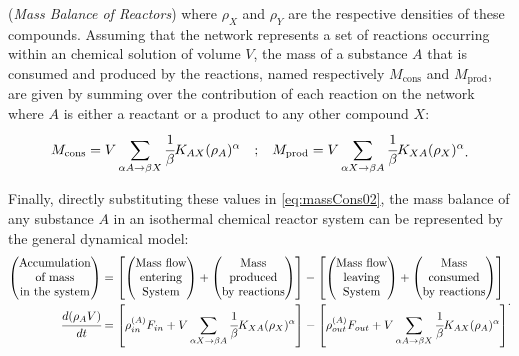 \documentclass[a4paper,11pt]{book}
\numberwithin{figure}{chapter}
\numberwithin{equation}{chapter}
\numberwithin{table}{chapter}
\theoremstyle{definition}
\newtheorem{example}{Example}[chapter]
\newcounter{boxed-theorem}
\newcounter{boxed-definition}
\newcounter{boxed-example}
\newenvironment{boxed-example}[1]
{\colorlet{shadecolor}{pastelRed!20} \begin{shaded} \begin{example}{#1}}
{\end{example} \end{shaded}}
\begin{document}
\begin{boxed-example}{(\textit{Mass Balance of Reactors})}
    \noindent where $\rho_X$ and $\rho_Y$ are the respective densities of these compounds. Assuming that the network represents a set of reactions occurring within an chemical solution of volume $V$, the mass of a substance $A$ that is consumed and produced by the reactions, named respectively $M_\text{cons}$ and $M_\text{prod}$, are given by summing over the contribution of each reaction on the network where $A$ is either a reactant or a product to any other compound $X$:
    \begin{equation}
    \begin{matrix}
            M_\text{cons} = V \displaystyle\sum_{\alpha A \rightarrow \beta X} \cfrac{1}{\beta} K_{AX} (\rho_A)^{\alpha} &; &  M_\text{prod} = V \displaystyle\sum_{\alpha X \rightarrow \beta A} \cfrac{1}{\beta} K_{XA} (\rho_X)^{\alpha}
    \end{matrix}
    .\end{equation}
    
    Finally, directly substituting these values in \eqref{eq:massCons02}, the mass balance of any substance $A$ in an isothermal chemical reactor system can be represented by the general dynamical model:
    \begin{equation}
    \begin{split}
        \begin{pmatrix}
        \text{Accumulation} \\ \text{of mass} \\ \text{in the system}
    \end{pmatrix} &= \left[ \begin{pmatrix}
        \text{Mass flow} \\ \text{entering} \\ \text{System}
    \end{pmatrix} + \begin{pmatrix}
        \text{Mass} \\  \text{produced} \\ \text{by reactions}
    \end{pmatrix} \right] - \left[ \begin{pmatrix}
        \text{Mass flow} \\ \text{leaving} \\ \text{System}
    \end{pmatrix} + \begin{pmatrix}
        \text{Mass} \\ \text{consumed} \\ \text{by reactions}
    \end{pmatrix} \right] \\
        \cfrac{d (\rho_A V)}{dt} &= \left[ \rho^{(A)}_{in} F_{in} + V \sum_{\alpha X \rightarrow \beta A} \cfrac{1}{\beta} K_{XA} (\rho_X)^{\alpha} \right] - \left[ \rho^{(A)}_{out} F_{out} + V \sum_{\alpha A \rightarrow \beta X} \cfrac{1}{\beta} K_{AX} (\rho_A)^{\alpha} \right]
    \end{split}
    .\end{equation}
    

\end{boxed-example}
\end{document}
